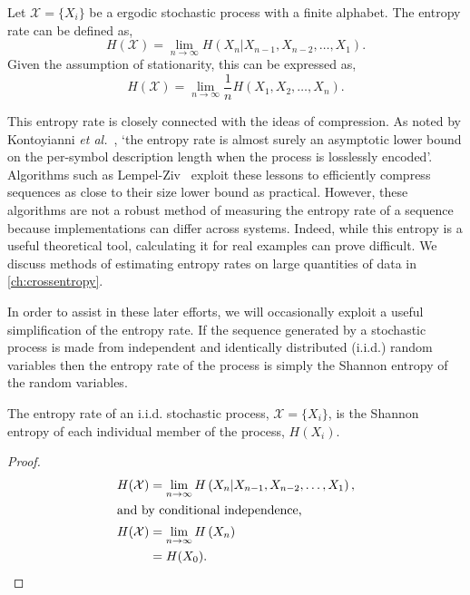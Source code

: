 \begin{definition}\label{def:entropyrate}
	Let  $\mathcal{X}= \{ X_i \}$ be a ergodic stochastic process with a finite alphabet. 
	The entropy rate can be defined as,
	\begin{equation}\label{eq:entropyrate}
	H(\mathcal{X})=\lim _{n \rightarrow \infty} H\left(X_{n} | X_{n-1}, X_{n-2}, \ldots, X_{1}\right).
	\end{equation}
	Given the assumption of stationarity, this can be expressed as,
	\begin{equation}
	H(\mathcal{X})=\lim _{n \rightarrow \infty} \frac{1}{n} H\left(X_{1}, X_{2}, \ldots, X_{n}\right).
	\end{equation}
\end{definition}


This entropy rate is closely connected with the ideas of compression. As noted by Kontoyianni \emph{et al.}~\cite{kontoyiannis_nonparametric_1998}, `the entropy rate is almost surely an asymptotic lower bound on the per-symbol description length when the process is losslessly encoded'. Algorithms such as Lempel-Ziv~\cite{ziv_compression_1978} exploit these lessons to efficiently compress sequences as close to their size lower bound as practical. However, these algorithms are not a robust method of measuring the entropy rate of a sequence because implementations can differ across systems. Indeed, while this entropy is a useful theoretical tool, calculating it for real examples can prove difficult. We discuss methods of estimating entropy rates on large quantities of data in \autoref{ch:crossentropy}.

In order to assist in these later efforts, we will occasionally exploit a useful simplification of the entropy rate. If the sequence generated by a stochastic process is made from independent and identically distributed  (i.i.d.) random variables then the entropy rate of the process is simply the Shannon entropy of the random variables. 

\begin{lemma}
	The entropy rate of an i.i.d. stochastic process, $\mathcal{X}= \{ X_i \}$, is the Shannon entropy of each individual member of the process, $H(X_i)$.
\end{lemma}

\begin{proof}\label{proof:iidentroptrate}
\begin{align}
H(\mathcal{X})&=\lim _{n \rightarrow \infty} H\left(X_{n} | X_{n-1}, X_{n-2}, \ldots, X_{1}\right), \\
\intertext{and by conditional independence,}
H(\mathcal{X}) &=\lim _{n \rightarrow \infty} H\left(X_{n} \right) \nonumber \\
&= H(X_0).
\end{align}
\end{proof}

